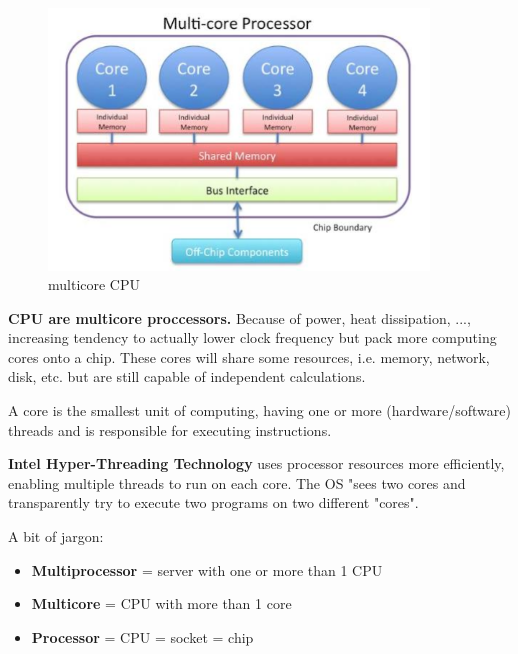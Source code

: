 \begin{minipage}[t]{0.45\textwidth}
        \begin{figure}[H]
            \centering 
            \includegraphics[width=0.9\textwidth]{assets/fig24.png}
            \caption{multicore CPU}
        \end{figure}
\end{minipage}
\begin{minipage}[t]{0.45\textwidth}
\vspace{1cm}
\textbf{CPU are multicore proccessors.} Because of power, heat dissipation, ..., increasing tendency to actually lower clock frequency but pack more computing cores onto a chip. These cores will share some resources, i.e. memory, network, disk, etc. but are still capable of independent calculations. 
\end{minipage}

\begin{definitionblock}[Core]
    A core is the smallest unit of computing, having one or more (hardware/software) threads and is responsible for executing instructions.
\end{definitionblock}

\textbf{Intel \textregistered Hyper-Threading Technology} uses processor resources more efficiently, enabling multiple threads to run on each core. The OS "sees two cores and transparently try to execute two programs on two different "cores". 

A bit of jargon:
\begin{itemize}
    \item \textbf{Multiprocessor} = server with one or more than 1 CPU 
    \item \textbf{Multicore} = CPU with more than 1 core
    \item \textbf{Processor} = CPU = socket = chip
\end{itemize}

